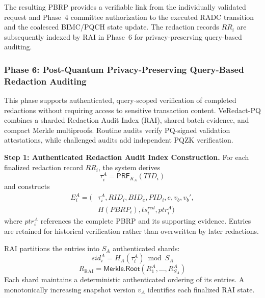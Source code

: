 \documentclass[lettersize,journal]{IEEEtran}
\begin{document}
    
    The resulting PBRP provides a verifiable link from the individually
    validated request and Phase~4 committee authorization to the executed
    RADC transition and the coalesced BIMC/PQCH state update. The
    redaction records ${RR_i}$ are subsequently indexed by RAI in
    Phase~6 for privacy-preserving query-based auditing.
    
    
    \subsubsection*{\textbf{Phase 6: Post-Quantum
    Privacy-Preserving Query-Based Redaction Auditing}}
    
    This phase supports authenticated, query-scoped
    verification of completed redactions without
    requiring access to sensitive transaction content.
    VeRedact-PQ combines a sharded Redaction Audit
    Index (RAI), shared batch evidence, and compact
    Merkle multiproofs. Routine audits verify PQ-signed
    validation attestations, while challenged audits
    add independent PQZK verification.
    
    \medskip
    \noindent\textbf{Step 1: Authenticated Redaction
    Audit Index Construction.}
    For each finalized redaction record $RR_i$,
    the system derives
    \begin{equation}
    \tau_i^A=
    \mathsf{PRF}_{K_A}(TID_i)
    \end{equation}
    and constructs
    \begin{equation}
    \begin{aligned}
    E_i^A=\big(
    &\tau_i^A,RID_i,BID_e,PID_i,e,v_b,v_b',
    \\&H(PBRP_i) {,}
    ts_i^{red},ptr_i^A\big)
    \end{aligned}
    \end{equation}
    where $ptr_i^A$ references the complete
    PBRP and its supporting evidence. Entries
    are retained for historical verification
    rather than overwritten by later redactions.
    
    RAI partitions the entries into $S_A$
    authenticated shards:
    \begin{equation}
    sid_i^A=H_A(\tau_i^A)\bmod S_A
    \end{equation}
    \begin{equation}
    R_{\mathrm{RAI}}=
    \mathsf{Merkle.Root}
    (R_1^A,\ldots,R_{S_A}^A)
    \end{equation}
    Each shard maintains a deterministic
    authenticated ordering of its entries.
    A monotonically increasing snapshot
    version $v_A$ identifies each finalized
    RAI state.
    
\end{document}
